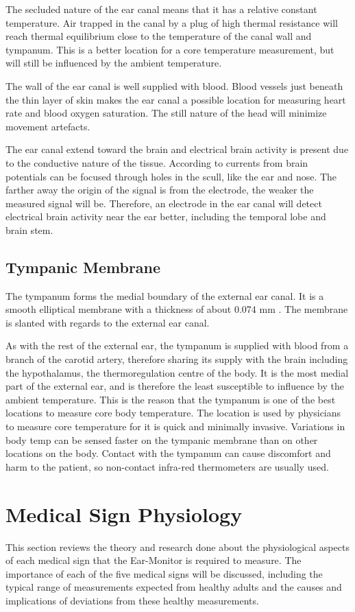 \medskip
The secluded nature of the ear canal means that it has a relative constant temperature. Air trapped in the canal by a plug of high thermal resistance will reach thermal equilibrium close to the temperature of the canal wall and tympanum. This is a better location for a core temperature measurement, but will still be influenced by the ambient temperature.

\medskip
The wall of the ear canal is well supplied with blood. Blood vessels just beneath the thin layer of skin makes the ear canal a possible location for measuring heart rate and blood oxygen saturation. The still nature of the head will minimize movement artefacts.

\medskip
The ear canal extend toward the brain and electrical brain activity is present due to the conductive nature of the tissue. According to \cite{nunez2006electric} currents from brain potentials can be focused through holes in the scull, like the ear and nose. The farther away the origin of the signal is from the electrode, the weaker the measured signal will be. Therefore, an electrode in the ear canal will detect electrical brain activity near the ear better, including the temporal lobe and brain stem.

\subsection{Tympanic Membrane}
The tympanum forms the medial boundary of the external ear canal. It is a smooth elliptical membrane with a thickness of about 0.074 mm \citep{alvord1997anatomy}. The membrane is slanted with regards to the external ear canal.

\medskip
As with the rest of the external ear, the tympanum is supplied with blood from a branch of the carotid artery, therefore sharing its supply with the brain including the hypothalamus, the thermoregulation centre of the body. It is the most medial part of the external ear, and is therefore the least susceptible to influence by the ambient temperature. This is the reason that the tympanum is one of the best locations to measure core body temperature. The location is used by physicians to measure core temperature for it is quick and minimally invasive. Variations in body temp can be sensed faster on the tympanic membrane than on other locations on the body. Contact with the tympanum can cause discomfort and harm to the patient, so non-contact infra-red thermometers are usually used.


\section{Medical Sign Physiology} %
This section reviews the theory and research done about the physiological aspects of each medical sign that the Ear-Monitor is required to measure. The importance of each of the five medical signs will be discussed, including the typical range of measurements expected from healthy adults and the causes and implications of deviations from these healthy measurements.


